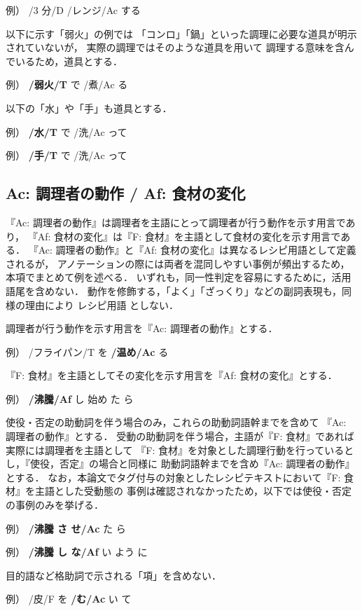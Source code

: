 \documentclass[japanese]{jnlp_1.4}
\begin{document}
\quad \noindent 例） /3 分/D /レンジ/Ac する

以下に示す「弱火」の例では
「コンロ」「鍋」といった調理に必要な道具が明示されていないが，
実際の調理ではそのような道具を用いて
調理する意味を含んでいるため，道具とする．

\quad \noindent 例） {\bf /弱火/T} で /煮/Ac る

以下の「水」や「手」も道具とする．

\quad \noindent 例） {\bf /水/T} で /洗/Ac って

\quad \noindent 例） {\bf /手/T} で /洗/Ac って


\subsection{Ac: 調理者の動作 / Af: 食材の変化}

『Ac: 調理者の動作』は調理者を主語にとって調理者が行う動作を示す用言であり，
『Af: 食材の変化』は『F: 食材』を主語として食材の変化を示す用言である．
『Ac: 調理者の動作』と『Af: 食材の変化』は異なるレシピ用語として定義されるが，
アノテーションの際には両者を混同しやすい事例が頻出するため，本項でまとめて例を述べる．
いずれも，同一性判定を容易にするために，活用語尾を含めない．
動作を修飾する，「よく」「ざっくり」などの副詞表現も，同様の理由により
レシピ用語
としない．

調理者が行う動作を示す用言を『Ac: 調理者の動作』とする．

\quad \noindent 例） /フライパン/T を {\bf /温め/Ac} る

『F: 食材』を主語としてその変化を示す用言を『Af: 食材の変化』とする．

\quad \noindent 例） {\bf /沸騰/Af} し 始め た ら

使役・否定の助動詞を伴う場合のみ，これらの助動詞語幹までを含めて
『Ac: 調理者の動作』とする．
受動の助動詞を伴う場合，主語が『F: 食材』であれば実際には調理者を主語として
『F: 食材』を対象とした調理行動を行っているとし，『使役，否定』の場合と同様に
助動詞語幹までを含め『Ac: 調理者の動作』とする．
なお，本論文でタグ付与の対象としたレシピテキストにおいて『F: 食材』を主語とした受動態の
事例は確認されなかったため，以下では使役・否定の事例のみを挙げる．

\quad \noindent 例） {\bf /沸騰 さ せ/Ac} た ら

\quad \noindent 例） {\bf /沸騰 し な/Af} い よう に

目的語など格助詞で示される「項」を含めない．

\quad \noindent 例） /皮/F を {\bf /む/Ac} い て
\end{document}
